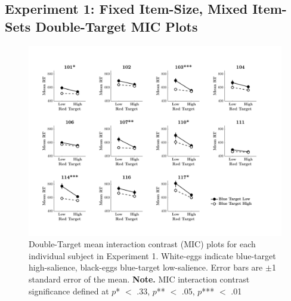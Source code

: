 \subsection{Experiment 1: Fixed Item-Size, Mixed Item-Sets Double-Target MIC Plots}
\begin{figure}[htb]
\begin{center}
\includegraphics[width=\linewidth]{Figures/Appendix/FIG27PNG.png}
\caption{Double-Target mean interaction contrast (MIC) plots for each individual subject in Experiment 1. White-eggs indicate blue-target high-salience, black-eggs blue-target low-salience. Error bars are $\pm$1 standard error of the mean.  \newline
\textbf{Note.} MIC interaction contrast significance defined at $p$* $<$ .33, $p$** $<$ .05, $p$*** $<$ .01}
\label{fig:Indiv_MIC_AB_Ex1}
\end{center}
\end{figure}
\newpage

